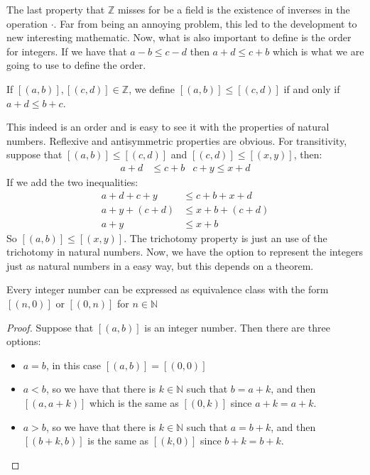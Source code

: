 \documentclass{tufte-handout}
\begin{document}
The last property that $\mathbb{Z}$ misses for be a field is the existence of inverses in the operation $\cdot$. Far from being an annoying problem, this led to the development to new interesting mathematic. Now, what is also important to define is the order for integers. If we have that $a - b \le c - d$ then $a + d \le c + b$ which is what we are going to use to define the order.

\begin{definition}
	If $[(a, b)], [(c, d)] \in \mathbb{Z}$, we define $[(a, b)] \le [(c, d)]$ if and only if $a + d \le b + c$.
\end{definition}

This indeed is an order and is easy to see it with the properties of natural numbers. Reflexive and antisymmetric properties are obvious. For transitivity, suppose that $[(a, b)] \le [(c, d)]$ and $[(c, d)] \le [(x, y)]$, then:
\begin{align*}
	a + d &\le c + b & c + y \le x + d
\end{align*}
If we add the two inequalities:
\begin{align*}
	a + d + c + y &\le c + b + x + d\\
	a + y + (c + d) &\le x + b + (c + d)\\
	a + y &\le x + b
\end{align*}
So $[(a, b)] \le [(x, y)]$. The trichotomy property is just an use of the trichotomy in natural numbers. Now, we have the option to represent the integers just as natural numbers in a easy way, but this depends on a theorem.

\begin{theorem}
	Every integer number can be expressed as equivalence class with the form $[(n, 0)]$ or $[(0, n)]$ for $n \in \mathbb{N}$
\end{theorem}
\begin{proof}
	Suppose that $[(a, b)]$ is an integer number. Then there are three options:
	\begin{itemize}
		\item $a = b$, in this case $[(a, b)] = [(0, 0)]$
		\item $a < b$, so we have that there is $k \in \mathbb{N}$ such that $b = a + k$, and then $[(a, a+k)]$ which is the same as $[(0, k)]$ since $ a + k = a + k$. 
		\item $a > b$, so we have that there is $k \in \mathbb{N}$ such that $a = b + k$, and then $[(b+k, b)]$ is the same as $[(k, 0)]$ since $b + k = b + k$.
	\end{itemize}
\end{proof}
\end{document}
